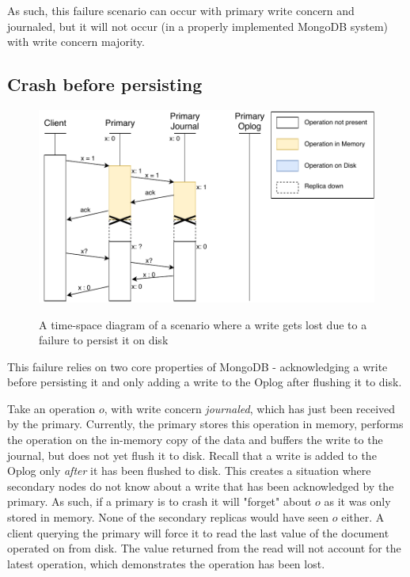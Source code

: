 As such, this failure scenario can occur with primary write concern and journaled, but it will not occur (in a properly implemented MongoDB system) with write concern majority.

\pagebreak
\subsection{Crash before persisting}
\begin{figure}[H]
    \centering
    \includegraphics{images/nopersist.pdf}
    \label{fig:nopersist}
    \caption{A time-space diagram of a scenario where a write gets lost due to a failure to persist it on disk}
\end{figure}

This failure relies on two core properties of MongoDB - acknowledging a write before persisting it and only adding a write to the Oplog after flushing it to disk.

Take an operation $o$, with write concern \textit{journaled}, which has just been received by the primary. Currently, the primary stores this operation in memory, performs the operation on the in-memory copy of the data and buffers the write to the journal, but does not yet flush it to disk. Recall that a write is added to the Oplog only \textit{after} it has been flushed to disk. This creates a situation where secondary nodes do not know about a write that has been acknowledged by the primary. As such, if a primary is to crash it will "forget" about $o$ as it was only stored in memory. None of the secondary replicas would have seen $o$ either. A client querying the primary will force it to read the last value of the document operated on from disk. The value returned from the read will not account for the latest operation, which demonstrates the operation has been lost.

